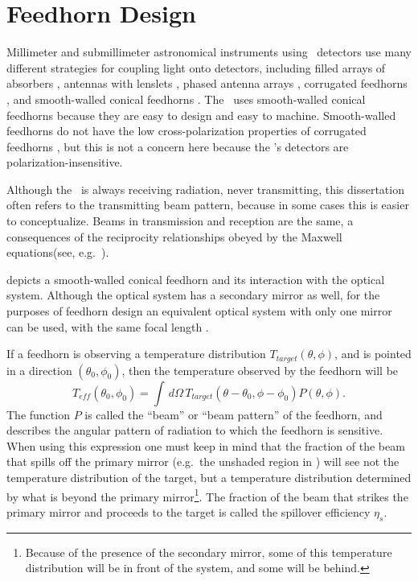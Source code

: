 
\section{Feedhorn Design}\label{sec:ch4-feedhorn-design}

Millimeter and submillimeter astronomical instruments using \TES\ detectors use many different strategies for coupling light onto detectors, including filled arrays of absorbers \cite{swetz_overview_2011,holland_scuba-2:_2013}, antennas with lenslets \cite{keating_ultra_2011}, phased antenna arrays \cite{obrient_antenna-coupled_2012}, corrugated feedhorns \cite{austermann_sptpol:_2012,niemack_actpol:_2010}, and smooth-walled conical feedhorns \cite{schwan_invited_2011,carlstrom_10_2011}.
The \Imager\ uses smooth-walled conical feedhorns because they are easy to design and easy to machine.
Smooth-walled feedhorns do not have the low cross-polarization properties of corrugated feedhorns \cite{clarricoats_corrugated_1984}, but this is not a concern here because the \Imager's detectors are polarization-insensitive.

Although the \Imager\ is always receiving radiation, never transmitting, this dissertation often refers to the transmitting beam pattern, because in some cases this is easier to conceptualize.
Beams in transmission and reception are the same, a consequences of the reciprocity relationships obeyed by the Maxwell equations(see, e.g.\ \cite{balanis_antenna_2005}).

 depicts a smooth-walled conical feedhorn and its interaction with the optical system.
Although the optical system has a secondary mirror as well, for the purposes of feedhorn design an equivalent optical system with only one mirror can be used, with the same focal length \cite{goldsmith_quasioptical_1998}.

If a feedhorn is observing a temperature distribution $T_{target}(\theta,\phi)$, and is pointed in a direction $(\theta_0, \phi_0)$, then the temperature observed by the feedhorn will be
\begin{equation}
    T_{eff}(\theta_0,\phi_0) = \int \, d \Omega \, T_{target}(\theta - \theta_0,\phi - \phi_0) P(\theta,\phi).
\end{equation}
The function $P$ is called the ``beam'' or ``beam pattern'' of the feedhorn, and describes the angular pattern of radiation to which the feedhorn is sensitive.
When using this expression one must keep in mind that the fraction of the beam that spills off the primary mirror (e.g.\ the unshaded region in ) will see not the temperature distribution of the target, but a temperature distribution determined by what is beyond the primary mirror\footnote{Because of the presence of the secondary mirror, some of this temperature distribution will be in front of the system, and some will be behind.}.
The fraction of the beam that strikes the primary mirror and proceeds to the target is called the spillover efficiency $\eta_s$.

